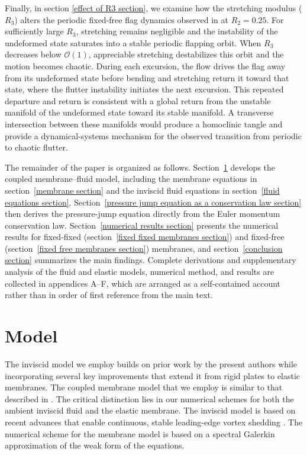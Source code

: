 \documentclass{article}[12pt]
\theoremstyle{Theorem}
\begin{document}
Finally, in section \ref{effect of R3 section}, we examine how the stretching modulus ($R_3$) alters the periodic fixed-free flag dynamics observed in \cite{alben2008flapping} at $R_2=0.25$. For sufficiently large $R_3$, stretching remains negligible and the instability of the undeformed state saturates into a stable periodic flapping orbit. When $R_3$ decreases below $\mathcal{O}(1)$, appreciable stretching destabilizes this orbit and the motion becomes chaotic. During each excursion, the flow drives the flag away from its undeformed state before bending and stretching return it toward that state, where the flutter instability initiates the next excursion. This repeated departure and return is consistent with a global return from the unstable manifold of the undeformed state toward its stable manifold. A transverse intersection between these manifolds would produce a homoclinic tangle and provide a dynamical-systems mechanism for the observed transition from periodic to chaotic flutter.
\newline

The remainder of the paper is organized as follows. Section~\ref{model section} develops the coupled membrane--fluid model, including the membrane equations in section~\ref{membrane section} and the inviscid fluid equations in section~\ref{fluid equations section}. Section~\ref{pressure jump equation as a conservation law section} then derives the pressure-jump equation directly from the Euler momentum conservation law. Section~\ref{numerical results section} presents the numerical results for fixed-fixed (section~\ref{fixed fixed membranes section}) and fixed-free (section~\ref{fixed free membranes section}) membranes, and section~\ref{conclusion section} summarizes the main findings. Complete derivations and supplementary analysis of the fluid and elastic models, numerical method, and results are collected in appendices A--F, which are arranged as a self-contained account rather than in order of first reference from the main text.
\newline




\section{Model}
\label{model section}
The inviscid model we employ builds on prior work by the present authors \cite{loo2025falling, loo2026comparisoninviscidviscousvortex} while incorporating several key improvements that extend it from rigid plates to elastic membranes. The coupled membrane model that we employ is similar to that described in \cite{mavroyiakoumou2020large,mavroyiakoumou2025sail}. The critical distinction lies in our numerical schemes for both the ambient inviscid fluid and the elastic membrane. The inviscid model is based on recent advances that enable continuous, stable leading-edge vortex shedding \cite{loo2025falling, loo2026comparisoninviscidviscousvortex}. The numerical scheme for the membrane model is based on a spectral Galerkin approximation of the weak form of the equations.
\end{document}
